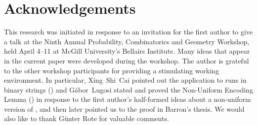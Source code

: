 \documentclass{patmorin}
\begin{document}
\section*{Acknowledgements}

This research was initiated in response to an invitation for the first
author to give a talk at the Ninth Annual Probability, Combinatorics
and Geometry Workshop, held April 4--11 at McGill University's
Bellairs Institute.  Many ideas that appear in the current paper were
developed during the workshop. The author is grateful to the other
workshop participants for providing a stimulating working environment.
In particular, Xing~Shi~Cai pointed out the application to runs in
binary strings () and G\'abor~Lugosi stated and proved
the Non-Uniform Encoding Lemma () in response to the first
author's half-formed ideas about a non-uniform version of ,
and then later pointed us to the proof in Barron's thesis.  We would
also like to thank G\"unter Rote for valuable comments.

{}

\end{document}
